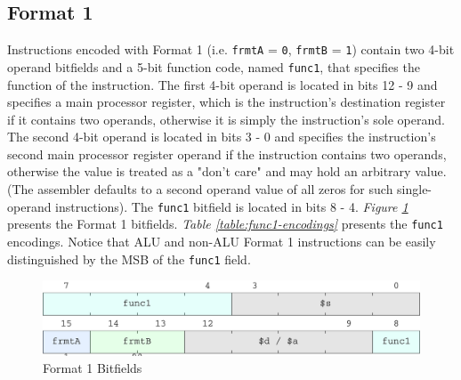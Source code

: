 \documentclass[sigconf, nonacm=true, screen=true]{acmart}
\begin{document}
\subsection{Format 1}
Instructions encoded with Format 1 (i.e. \texttt{frmtA} = \texttt{0}, \texttt{frmtB} = \texttt{1}) contain two 4-bit operand bitfields and a 5-bit function code, named \texttt{func1}, that specifies the function of the instruction. The first 4-bit operand is located in bits 12 - 9 and specifies a main processor register, which is the instruction's destination register if it contains two operands, otherwise it is simply the instruction's sole operand. The second 4-bit operand is located in bits 3 - 0 and specifies the instruction's second main processor register operand if the instruction contains two operands, otherwise the value is treated as a "don't care" and may hold an arbitrary value. (The assembler defaults to a second operand value of all zeros for such single-operand instructions). The \texttt{func1} bitfield is located in bits 8 - 4. \textit{Figure \ref{figure:format1-bitfields}} presents the Format 1 bitfields. \textit{Table \ref{table:func1-encodings}} presents the \texttt{func1} encodings. Notice that ALU and non-ALU Format 1 instructions can be easily distinguished by the MSB of the \texttt{func1} field. 

\begin{figure}[h]
    \includegraphics[width=\columnwidth]{bitfields/format1_2-lane.pdf}
    \caption{Format 1 Bitfields}
    \label{figure:format1-bitfields}
\end{figure}
\end{document}
